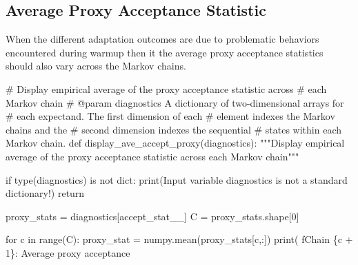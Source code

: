 \documentclass[
  letterpaper,
  DIV=11,
  numbers=noendperiod]{scrartcl}
\newenvironment{Shaded}{\begin{snugshade}}{\end{snugshade}}
\newcommand{\BuiltInTok}[1]{\textcolor[rgb]{0.00,0.23,0.31}{#1}}
\newcommand{\CommentTok}[1]{\textcolor[rgb]{0.37,0.37,0.37}{#1}}
\newcommand{\ControlFlowTok}[1]{\textcolor[rgb]{0.00,0.23,0.31}{#1}}
\newcommand{\DecValTok}[1]{\textcolor[rgb]{0.68,0.00,0.00}{#1}}
\newcommand{\KeywordTok}[1]{\textcolor[rgb]{0.00,0.23,0.31}{#1}}
\newcommand{\NormalTok}[1]{\textcolor[rgb]{0.00,0.23,0.31}{#1}}
\newcommand{\OperatorTok}[1]{\textcolor[rgb]{0.37,0.37,0.37}{#1}}
\newcommand{\SpecialCharTok}[1]{\textcolor[rgb]{0.37,0.37,0.37}{#1}}
\newcommand{\SpecialStringTok}[1]{\textcolor[rgb]{0.13,0.47,0.30}{#1}}
\newcommand{\StringTok}[1]{\textcolor[rgb]{0.13,0.47,0.30}{#1}}
\begin{document}
\hypertarget{average-proxy-acceptance-statistic}{%
\subsection{Average Proxy Acceptance
Statistic}\label{average-proxy-acceptance-statistic}}

When the different adaptation outcomes are due to problematic behaviors
encountered during warmup then it the average proxy acceptance
statistics should also vary across the Markov chains.

\begin{Shaded}
\begin{Highlighting}[]

\CommentTok{\# Display empirical average of the proxy acceptance statistic across }
\CommentTok{\# each Markov chain}
\CommentTok{\# @param diagnostics A dictionary of two{-}dimensional arrays for }
\CommentTok{\#                    each expectand.  The first dimension of each}
\CommentTok{\#                    element indexes the Markov chains and the }
\CommentTok{\#                    second dimension indexes the sequential }
\CommentTok{\#                    states within each Markov chain.}
\KeywordTok{def}\NormalTok{ display\_ave\_accept\_proxy(diagnostics):}
  \CommentTok{"""Display empirical average of the proxy acceptance statistic}
\CommentTok{     across each Markov chain"""}
     
  \ControlFlowTok{if} \BuiltInTok{type}\NormalTok{(diagnostics) }\KeywordTok{is} \KeywordTok{not} \BuiltInTok{dict}\NormalTok{:}
    \BuiltInTok{print}\NormalTok{(}\StringTok{\textquotesingle{}Input variable \textasciigrave{}diagnostics\textasciigrave{} is not a standard dictionary!\textquotesingle{}}\NormalTok{)}
    \ControlFlowTok{return}
  
\NormalTok{  proxy\_stats }\OperatorTok{=}\NormalTok{ diagnostics[}\StringTok{\textquotesingle{}accept\_stat\_\_\textquotesingle{}}\NormalTok{]}
\NormalTok{  C }\OperatorTok{=}\NormalTok{ proxy\_stats.shape[}\DecValTok{0}\NormalTok{]}
  
  \ControlFlowTok{for}\NormalTok{ c }\KeywordTok{in} \BuiltInTok{range}\NormalTok{(C):}
\NormalTok{    proxy\_stat }\OperatorTok{=}\NormalTok{ numpy.mean(proxy\_stats[c,:])}
    \BuiltInTok{print}\NormalTok{(  }\SpecialStringTok{f\textquotesingle{}Chain }\SpecialCharTok{\{}\NormalTok{c }\OperatorTok{+} \DecValTok{1}\SpecialCharTok{\}}\SpecialStringTok{: Average proxy acceptance \textquotesingle{}}
\end{Highlighting}
\end{Shaded}
\end{document}

